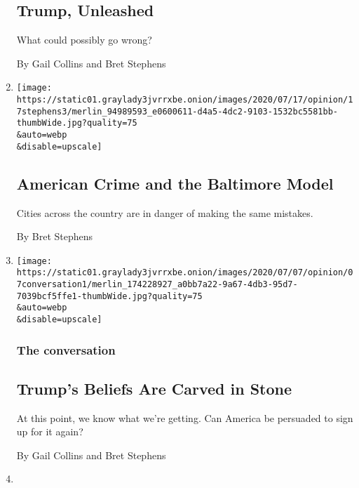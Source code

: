 \begin{enumerate}
  \hypertarget{trump-unleashed}{%
  \subsection{Trump, Unleashed}\label{trump-unleashed}}

  What could possibly go wrong?

  By Gail Collins and Bret Stephens
\item
  \href{/2020/07/17/opinion/policing-crime-baltimore.html}{}

  \texttt{[image: https://static01.graylady3jvrrxbe.onion/images/2020/07/17/opinion/17stephens3/merlin\_94989593\_e0600611-d4a5-4dc2-9103-1532bc5581bb-thumbWide.jpg?quality=75\\\&auto=webp\\\&disable=upscale]}

  \hypertarget{american-crime-and-the-baltimore-model}{%
  \subsection{American Crime and the Baltimore
  Model}\label{american-crime-and-the-baltimore-model}}

  Cities across the country are in danger of making the same mistakes.

  By Bret Stephens
\item
  \href{/2020/07/07/opinion/trump-coronavirus-mount-rushmore.html}{}

  \texttt{[image: https://static01.graylady3jvrrxbe.onion/images/2020/07/07/opinion/07conversation1/merlin\_174228927\_a0bb7a22-9a67-4db3-95d7-7039bcf5ffe1-thumbWide.jpg?quality=75\\\&auto=webp\\\&disable=upscale]}

  \hypertarget{the-conversation-3}{%
  \subsubsection{The conversation}\label{the-conversation-3}}

  \hypertarget{trumps-beliefs-are-carved-in-stone}{%
  \subsection{Trump's Beliefs Are Carved in
  Stone}\label{trumps-beliefs-are-carved-in-stone}}

  At this point, we know what we're getting. Can America be persuaded to
  sign up for it again?

  By Gail Collins and Bret Stephens
\item
  \href{/2020/07/03/opinion/orwell-fourth-of-july.html}{}


\end{enumerate}
